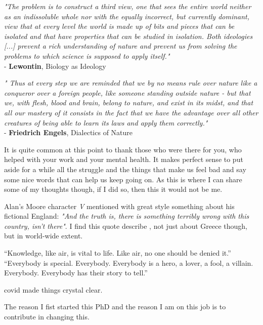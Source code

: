 \documentclass[master=elt, cleveref, autoref, masteroption=eg]{kulemt}
\begin{document}
 

\begin{preface}
  
   \textit{
      "The problem is to construct a third view, one that sees the entire world 
      neither as an indissoluble whole nor with the equally incorrect, but currently dominant, 
      view that at every level the world is made up of bits and pieces that can be isolated 
      and that have properties that can be studied in isolation. 
      Both ideologies [...] prevent a rich understanding of nature and prevent us from solving 
      the problems to which science is supposed to apply itself." \\
      }
   - \textbf{Lewontin}, Biology as Ideology

   \textit{
      "
      Thus at every step we are reminded that we by no means rule over nature like a conqueror over a foreign people, 
      like someone standing outside nature - but that we, with flesh, blood and brain, belong to nature, 
      and exist in its midst, and that all our mastery of it consists in the fact that we have the advantage over 
      all other creatures of being able to learn its laws and apply them correctly." \\
      }
   - \textbf{Friedrich Engels}, Dialectics of Nature


   It is quite common at this point to thank those who were there for you, 
   who helped with your work and your mental health. 
   It makes perfect sense to put aside for a while all the struggle and the 
   things that make us feel bad and say some nice words that can help us keep going on. 
   As this is where I can share some of my thoughts though, 
   if I did so, then this it would not be me. 
   
   Alan's Moore character \textit{V} mentioned with great style something about 
   his fictional England:   
   \textit{"And the truth is, there is something terribly wrong with this country, isn't there"}.
   I find this quote  describe , not just about Greece though, but in world-wide extent. 


   “Knowledge, like air, is vital to life. Like air, no one should be denied it.”
   “Everybody is special. Everybody. Everybody is a hero, a lover, a fool, a villain. Everybody. Everybody has their story to tell.”


   covid made things crystal clear. 


   The reason I fist started this PhD and the reason I am on this job is to contribute in changing this. 



\end{preface}
\end{document}
